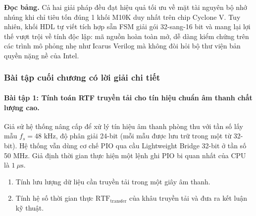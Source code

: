 \textbf{Đọc bảng.} Cả hai giải pháp đều đạt hiệu quả tối ưu về mặt tài nguyên bộ nhớ nhúng khi chỉ tiêu tốn đúng 1 khối M10K duy nhất trên chip Cyclone V. Tuy nhiên, khối HDL tự viết tích hợp sẵn FSM giải gói 32-sang-16 bit và mang lại lợi thế vượt trội về tính độc lập: mã nguồn hoàn toàn mở, dễ dàng kiểm chứng trên các trình mô phỏng nhẹ như Icarus Verilog mà không đòi hỏi bộ thư viện bản quyền nặng nề của Intel.

\subsubsection*{Bài tập cuối chương có lời giải chi tiết}

\paragraph{Bài tập 1: Tính toán RTF truyền tải cho tín hiệu chuẩn âm thanh chất lượng cao.}
Giả sử hệ thống nâng cấp để xử lý tín hiệu âm thanh phòng thu với tần số lấy mẫu $f_s = 48\text{ kHz}$, độ phân giải 24-bit (mỗi mẫu được lưu trữ trong một từ 32-bit). Hệ thống vẫn dùng cơ chế PIO qua cầu Lightweight Bridge 32-bit ở tần số 50 MHz. Giả định thời gian thực hiện một lệnh ghi PIO bi quan nhất của CPU là $1\ \mu\text{s}$.
\begin{enumerate}[label=(\alph*), itemsep=2pt]
    \item Tính lưu lượng dữ liệu cần truyền tải trong một giây âm thanh.
    \item Tính hệ số thời gian thực $\text{RTF}_{\text{transfer}}$ của khâu truyền tải và đưa ra kết luận kỹ thuật.
\end{enumerate}

